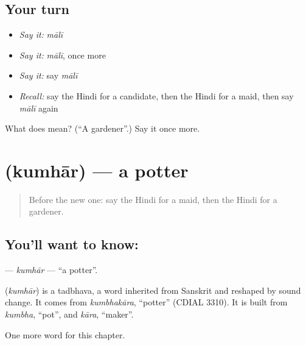 \subsection*{Your turn}
\begin{itemize}
\raggedright
  \item \emph{Say it:} \emph{mālī}
  \item \emph{Say it:} \emph{mālī}, once more
  \item \emph{Say it:} say \emph{mālī}
  \item \emph{Recall:} say the Hindi for a candidate, then the Hindi for a maid, then say \emph{mālī} again
\end{itemize}

\begin{tcolorbox}[breakable,colback=teal!4,colframe=teal!35!black,title={Before you move on}]
What does  mean? (\textquotedblleft{}A gardener\textquotedblright{}.) Say it once more.
\end{tcolorbox}
\section[\texorpdfstring{\hi{कुम्हार} (kumhār)}{कुम्हार (kumhār)}]{ (kumhār) — a potter}

\label{lesson:HI-C261-kumhar}



\begin{quote}
Before the new one: say the Hindi for a maid, then the Hindi for a gardener.
\end{quote}

\subsection*{You'll want to know: }
\textbf{} — \emph{kumhār} — \textquotedblleft{}a potter\textquotedblright{}.

\begin{cousinweb}
\textbf{} (\emph{kumhār}) is a tadbhava, a word inherited from Sanskrit and reshaped by sound change. It comes from \emph{kumbhakāra}, \textquotedblleft{}potter\textquotedblright{} (CDIAL 3310). It is built from \emph{kumbha}, \textquotedblleft{}pot\textquotedblright{}, and \emph{kāra}, \textquotedblleft{}maker\textquotedblright{}.
\end{cousinweb}

\begin{grammarlens}[title={What you've built}]
One more word for this chapter.
\end{grammarlens}

